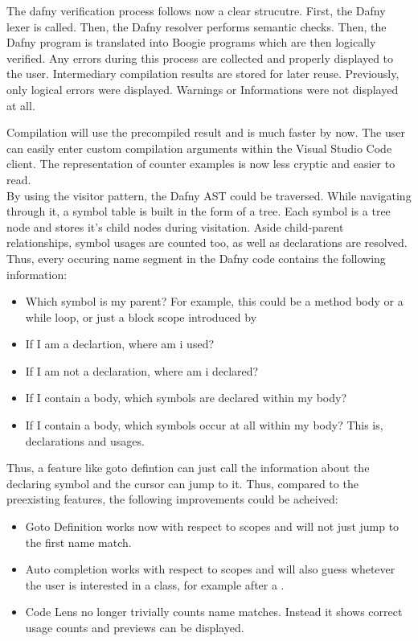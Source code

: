 The dafny verification process follows now a clear strucutre.
First, the Dafny lexer is called.
Then, the Dafny resolver performs semantic checks.
Then, the Dafny program is translated into Boogie programs which are then logically verified.
Any errors during this process are collected and properly displayed to the user.
Intermediary compilation results are stored for later reuse.
Previously, only logical errors were displayed.
Warnings or Informations were not displayed at all.

Compilation will use the precompiled result and is much faster by now.
The user can easily enter custom compilation arguments within the Visual Studio Code client.
The representation of counter examples is now less cryptic and easier to read.\\

By using the visitor pattern, the Dafny AST could be traversed.
While navigating through it, a symbol table is built in the form of a tree.
Each symbol is a tree node and stores it's child nodes during visitation.
Aside child-parent relationships, symbol usages are counted too, as well as declarations are resolved.
Thus, every occuring name segment in the Dafny code contains the following information:
\begin{itemize}
    \item Which symbol is my parent? For example, this could be a method body or a while loop, or just a block scope introduced by \code{\string{$\ddots$\string}}
    \item If I am a declartion, where am i used?
    \item If I am not a declaration, where am i declared?
    \item If I contain a body, which symbols are declared within my body?
    \item If I contain a body, which symbols occur at all within my body? This is, declarations and usages.
\end{itemize}
Thus, a feature like goto defintion can just call the information about the declaring symbol and the cursor can jump to it.
Thus, compared to the preexisting features, the following improvements could be acheived:
\begin{itemize}
    \item Goto Definition works now with respect to scopes and will not just jump to the first name match.
    \item Auto completion works with respect to scopes and will also guess whetever the user is interested in a class, for example after a .
    \item Code Lens no longer trivially counts name matches.
    Instead it shows correct usage counts and previews can be displayed.
\end{itemize}



